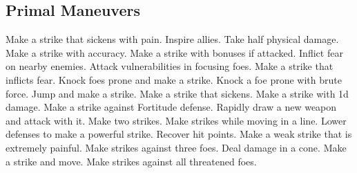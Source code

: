 \subsection{Primal Maneuvers}\label{Primal Maneuvers}
\begin{spelllist}
 Make a strike that sickens with pain.
 Inspire allies.
 Take half physical damage.
 Make a strike with  accuracy.
 Make a strike with bonuses if attacked.
 Inflict fear on nearby enemies.
 Attack vulnerabilities in focusing foes.
 Make a strike that inflicts fear.
 Knock foes prone and make a strike.
 Knock a foe prone with brute force.
 Jump and make a strike.
 Make a strike that sickens.
 Make a strike with \plus1d damage.
 Make a strike against Fortitude defense.
 Rapidly draw a new weapon and attack with it.
 Make two strikes.
 Make strikes while moving in a line.
 Lower defenses to make a powerful strike.
 Recover hit points.
 Make a weak strike that is extremely painful.
 Make strikes against three foes.
 Deal damage in a cone.
 Make a strike and move.
 Make strikes against all threatened foes.
\end{spelllist}



\small
